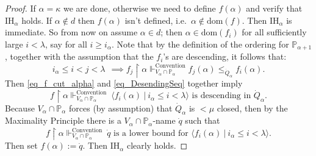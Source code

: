 \documentclass{amsart}
\begin{document}
\begin{proof}
If $\alpha = \kappa$ we are done, otherwise we need to define $f(\alpha)$ and verify that $\text{IH}_\alpha$ holds.  If $\alpha \notin d$ then $f(\alpha)$ isn't defined, i.e.\ $\alpha \notin \text{dom}(f)$.  Then $\text{IH}_\alpha$ is immediate.  So from now on assume $\alpha \in d$; then $\alpha \in \text{dom}(f_i)$ for all sufficiently large $i < \lambda$, say for all $i \ge i_{\alpha}$.  Note that by the definition of the ordering for $\mathbb{P}_{\alpha+1}$, together with the assumption that the $f_i$'s are descending, it follows that:
\begin{equation}\label{eq_DesendingSeq}
i_{\alpha} \le i < j < \lambda \ \ \implies f_j \restriction \alpha \Vdash^{\text{Convention}}_{V_{\alpha} \cap \mathbb{P}_{\alpha}}  f_j(\alpha) \le_{\dot{Q}_{\alpha}} f_i(\alpha).
\end{equation}
Then \eqref{eq_f_cut_alpha} and \eqref{eq_DesendingSeq} together imply
\[
f \restriction \alpha \Vdash^{\text{Convention}}_{V_{\alpha} \cap \mathbb{P}_{\alpha}} \ \langle f_i(\alpha) \ | \ i_{\alpha} \le i < \lambda \rangle \text{ is descending in } \dot{Q}_{\alpha}.
\]
Because $V_\alpha \cap \mathbb{P}_\alpha$ forces (by assumption) that $\dot{Q}_\alpha$ is $<\mu$ closed, then by the Maximality Principle there is a $V_\alpha \cap \mathbb{P}_\alpha$-name $\dot{q}$ such that
\[
f \restriction \alpha \Vdash^{\text{Convention}}_{V_{\alpha} \cap \mathbb{P}_{\alpha}} \  \dot{q} \text{ is a lower bound for }  \langle f_i(\alpha) \ | \ i_{\alpha} \le i < \lambda \rangle .
\]
Then set $f(\alpha):= \dot{q}$.  Then $\text{IH}_\alpha$ clearly holds.
\end{proof}
\end{document}
